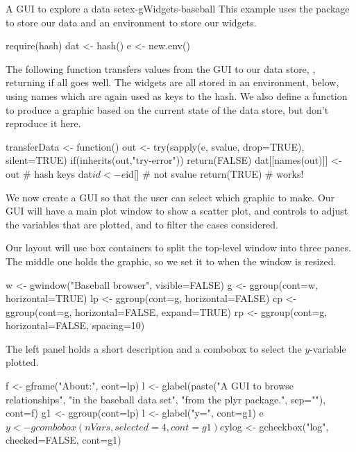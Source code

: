 \begin{example}{A GUI to explore a data set}{ex-gWidgets-baseball}
This example uses the  package to store our data and an environment to store our widgets.
\begin{Schunk}
\begin{Sinput}
 require(hash)
 dat <- hash()
 e <- new.env()
\end{Sinput}
\end{Schunk}

The following function transfers values from the GUI to our data
store, , returning  if all goes well. The widgets
are all stored in an environment,  below, using names which
are again used as keys to the hash. We also define a function
 to produce a graphic based on the current state of the
data store, but don't reproduce it here.
\begin{Schunk}
\begin{Sinput}
 transferData <- function() {
   out <- try(sapply(e, svalue, drop=TRUE), silent=TRUE)
   if(inherits(out,"try-error"))
     return(FALSE)
   dat[[names(out)]] <- out              # hash keys
   dat$id <- e$id[]                      # not svalue
   return(TRUE)                          # works!
 }
\end{Sinput}
\end{Schunk}


We now create a GUI so that the user can select which graphic to
make. Our GUI will have a main plot window to show a scatter plot, and
controls to adjust the variables that are plotted, and to filter the cases
considered.

Our layout will use box containers to split the top-level window into
three panes. The middle one holds the graphic, so we set it to
 when the window is resized.
\begin{Schunk}
\begin{Sinput}
 w <- gwindow("Baseball browser", visible=FALSE)
 g <-  ggroup(cont=w, horizontal=TRUE)
 lp <- ggroup(cont=g, horizontal=FALSE)
 cp <- ggroup(cont=g, horizontal=FALSE, expand=TRUE)
 rp <- ggroup(cont=g, horizontal=FALSE, spacing=10)
\end{Sinput}
\end{Schunk}

The left panel holds a short description and a combobox to select the $y$-variable plotted.
\begin{Schunk}
\begin{Sinput}
 f <- gframe("About:", cont=lp)
 l <- glabel(paste("A GUI to browse relationships",
              "in the baseball data set",
              "from the plyr package.",
              sep="\n"),
        cont=f)
 g1 <- ggroup(cont=lp)
 l <- glabel("y=", cont=g1)
 e$y <- gcombobox(nVars, selected=4, cont=g1)
 e$ylog <- gcheckbox("log", checked=FALSE, cont=g1)
\end{Sinput}
\end{Schunk}


\end{example}
